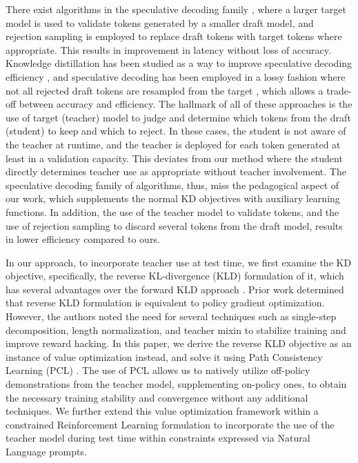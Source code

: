 There exist algorithms in the speculative decoding family \cite{chen2023accelerating}\cite{leviathan2023fast}, where a larger target model is used to validate tokens generated by a smaller draft model, and rejection sampling is employed to replace draft tokens with target tokens where appropriate. This results in improvement in latency without loss of accuracy. Knowledge distillation has been studied as a way to improve speculative decoding efficiency \cite{DistllSpec} \cite{liu2023online}, and speculative decoding has been employed in a lossy fashion where not all rejected draft tokens are resampled from the target \cite{DistllSpec}, which allows a trade-off between accuracy and efficiency.  The hallmark of all of these approaches is the use of target (teacher) model to judge and determine which tokens from the draft (student) to keep and which to reject. In these cases, the student is not aware of the teacher at runtime, and the teacher is deployed for each token generated at least in a validation capacity.  This deviates from our method where the student directly determines teacher use as appropriate without teacher involvement. The speculative decoding family of algorithms, thus, miss the pedagogical aspect of our work, which supplements the normal KD objectives with auxiliary learning functions. In addition, the use of the teacher model to validate tokens, and the use of rejection sampling to discard several tokens from the draft model, results in lower efficiency compared to ours.


In our approach, to incorporate teacher use at test time, we first examine the KD objective, specifically, the reverse KL-divergence (KLD) formulation of it, which has several advantages over the forward KLD approach \cite{huszar2015not}.  Prior work \cite{gu2023minillm} determined that reverse KLD formulation is equivalent to policy gradient optimization. However, the authors noted the need for several techniques such as single-step decomposition, length normalization, and teacher mixin to stabilize training and improve reward hacking. In this paper, we derive the reverse KLD objective as an instance of value optimization instead, and solve it using Path Consistency Learning (PCL) \cite{DBLP:journals/corr/NachumNXS17}.  The use of PCL allows us to natively utilize off-policy demonstrations from the teacher model, supplementing on-policy ones, to obtain the necessary training stability and convergence without any additional techniques. We further extend this value optimization framework within a constrained Reinforcement Learning formulation to incorporate the use of the teacher model during test time within constraints expressed via Natural Language prompts.

